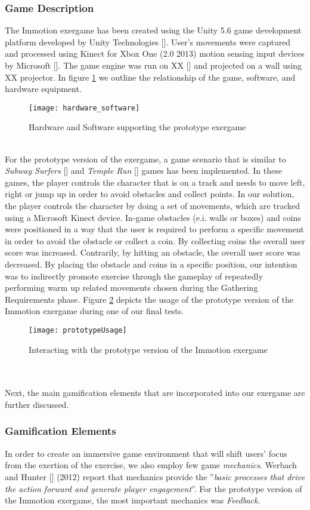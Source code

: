 \subsubsection{Game Description}
The Immotion exergame has been created using the Unity 5.6 game development platform developed by Unity Technologies []. User's movements were captured and processed using Kinect for Xbox One (2.0 2013) motion sensing input devices by Microsoft []. The game engine was run on XX [] and projected on a wall using XX projector. In figure \ref{fig:hs} we outline the relationship of the game, software, and hardware equipment.\\
\begin{figure}[h]
    \centering
    \texttt{[image: hardware\_software]}
    \caption{Hardware and Software supporting the prototype exergame}
    \label{fig:hs}
\end{figure}\\
For the prototype version of the exergame, a game scenario that is similar to \textit{Subway Surfers} [] and \textit{Temple Run} [] games has been implemented. In these games, the player controls the character that is on a track and needs to move left, right or jump up in order to avoid obstacles and collect points. In our solution, the player controls the character by doing a set of movements, which are tracked using a Microsoft Kinect device. In-game obstacles (e.i. walls or boxes) and coins were positioned in a way that the user is required to perform a specific movement in order to avoid the obstacle or collect a coin. By collecting coins the overall user score was increased. Contrarily, by hitting an obstacle, the overall user score was decreased. By placing the obstacle and coins in a specific position, our intention was to indirectly promote exercise through the gameplay of repeatedly performing warm up related movements chosen during the Gathering Requirements phase. Figure \ref{fig:prototypeUsage} depicts the usage of the prototype version of the Immotion exergame during one of our final tests.
\begin{figure}[h]
    \centering
    \texttt{[image: prototypeUsage]}
    \caption{Interacting with the prototype version of the Immotion exergame}
    \label{fig:prototypeUsage}
\end{figure}\\ \\
Next, the main gamification elements that are incorporated into our exergame are further discussed.
\subsubsection{Gamification Elements}
In order to create an immersive game environment that will shift users' focus from the exertion of the exercise, we also employ few game \textit{mechanics}.  Werbach and Hunter [] (2012) report that mechanics provide the ''\textit{basic processes that drive the action forward and generate
player engagement}''. For the prototype version of the Immotion exergame, the most important mechanics was \textit{Feedback}.

